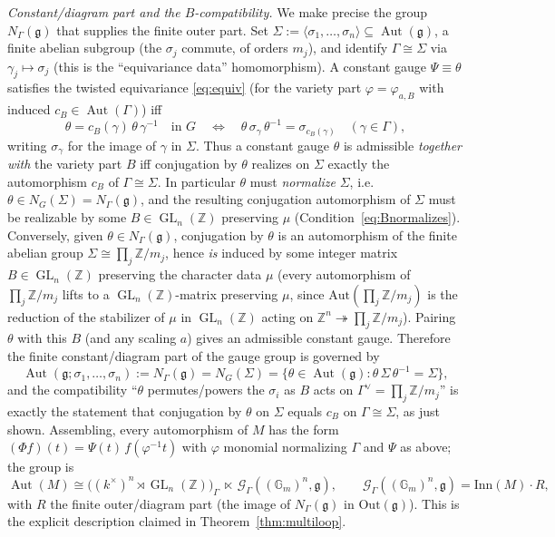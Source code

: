 \documentclass{amsart}
\theoremstyle{definition}
\DeclareMathOperator{\Aut}{Aut}
\DeclareMathOperator{\GL}{GL}
\newcommand{\Gm}{\mathbb{G}_m}
\newcommand{\g}{\mathfrak{g}}
\newcommand{\Z}{\mathbb{Z}}
\begin{document}
\emph{Constant/diagram part and the $B$-compatibility.}  We make precise the
group $N_\Gamma(\g)$ that supplies the finite outer part.  Set
$\Sigma:=\langle\sigma_1,\dots,\sigma_n\rangle\subseteq\Aut(\g)$, a finite
abelian subgroup (the $\sigma_j$ commute, of orders $m_j$), and identify
$\Gamma\cong\Sigma$ via $\gamma_j\mapsto\sigma_j$ (this is the
``equivariance data'' homomorphism).  A constant gauge $\Psi\equiv\theta$
satisfies the twisted equivariance \eqref{eq:equiv} (for the variety part
$\varphi=\varphi_{a,B}$ with induced $c_B\in\Aut(\Gamma)$) iff
\[
\theta=c_B(\gamma)\,\theta\,\gamma^{-1}\quad\text{in }G
\quad\Longleftrightarrow\quad
\theta\,\sigma_\gamma\,\theta^{-1}=\sigma_{c_B(\gamma)}\quad(\gamma\in\Gamma),
\]
writing $\sigma_\gamma$ for the image of $\gamma$ in $\Sigma$.  Thus a
constant gauge $\theta$ is admissible \emph{together with} the variety part
$B$ iff conjugation by $\theta$ realizes on $\Sigma$ exactly the
automorphism $c_B$ of $\Gamma\cong\Sigma$.  In particular $\theta$ must
\emph{normalize} $\Sigma$, i.e.\ $\theta\in N_G(\Sigma)=N_\Gamma(\g)$, and
the resulting conjugation automorphism of $\Sigma$ must be realizable by some
$B\in\GL_n(\Z)$ preserving $\mu$ (Condition~\eqref{eq:Bnormalizes}).
Conversely, given $\theta\in N_\Gamma(\g)$, conjugation by $\theta$ is an
automorphism of the finite abelian group $\Sigma\cong\prod_j\Z/m_j$, hence
\emph{is} induced by some integer matrix $B\in\GL_n(\Z)$ preserving the
character data $\mu$ (every automorphism of $\prod_j\Z/m_j$ lifts to a
$\GL_n(\Z)$-matrix preserving $\mu$, since $\mathrm{Aut}(\prod_j\Z/m_j)$ is
the reduction of the stabilizer of $\mu$ in $\GL_n(\Z)$ acting on
$\Z^n\twoheadrightarrow\prod_j\Z/m_j$).  Pairing $\theta$ with this $B$ (and
any scaling $a$) gives an admissible constant gauge.  Therefore the
finite constant/diagram part of the gauge group is governed by
\[
\Aut(\g;\sigma_1,\dots,\sigma_n):=N_\Gamma(\g)=N_G(\Sigma)
=\{\theta\in\Aut(\g):\theta\,\Sigma\,\theta^{-1}=\Sigma\},
\]
and the compatibility ``$\theta$ permutes/powers the $\sigma_i$ as $B$ acts
on $\Gamma^\vee=\prod_j\Z/m_j$'' is exactly the statement that conjugation by
$\theta$ on $\Sigma$ equals $c_B$ on $\Gamma\cong\Sigma$, as just shown.  Assembling, every
automorphism of $M$ has the form $(\Phi f)(t)=\Psi(t)\,f(\varphi^{-1}t)$
with $\varphi$ monomial normalizing $\Gamma$ and $\Psi$ as above; the
group is
\[
\Aut(M)\cong
\bigl((k^\times)^n\rtimes\GL_n(\Z)\bigr)_\Gamma\ \ltimes\
\mathcal G_\Gamma((\Gm)^n,\g),
\qquad
\mathcal G_\Gamma((\Gm)^n,\g)=\mathrm{Inn}(M)\cdot R,
\]
with $R$ the finite outer/diagram part (the image of $N_\Gamma(\g)$ in
$\mathrm{Out}(\g)$).  This is the explicit description claimed in
Theorem~\ref{thm:multiloop}.
\end{document}
